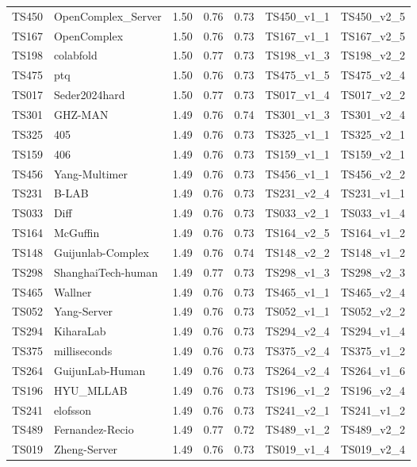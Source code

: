 \begin{longtable}{lllllll}
TS450 & OpenComplex\_Server & 1.50 & 0.76 & 0.73 & TS450\_v1\_1 & TS450\_v2\_5 \\ 
TS167 & OpenComplex & 1.50 & 0.76 & 0.73 & TS167\_v1\_1 & TS167\_v2\_5 \\ 
TS198 & colabfold & 1.50 & 0.77 & 0.73 & TS198\_v1\_3 & TS198\_v2\_2 \\ 
TS475 & ptq & 1.50 & 0.76 & 0.73 & TS475\_v1\_5 & TS475\_v2\_4 \\ 
TS017 & Seder2024hard & 1.50 & 0.77 & 0.73 & TS017\_v1\_4 & TS017\_v2\_2 \\ 
TS301 & GHZ-MAN & 1.49 & 0.76 & 0.74 & TS301\_v1\_3 & TS301\_v2\_4 \\ 
TS325 & 405 & 1.49 & 0.76 & 0.73 & TS325\_v1\_1 & TS325\_v2\_1 \\ 
TS159 & 406 & 1.49 & 0.76 & 0.73 & TS159\_v1\_1 & TS159\_v2\_1 \\ 
TS456 & Yang-Multimer & 1.49 & 0.76 & 0.73 & TS456\_v1\_1 & TS456\_v2\_2 \\ 
TS231 & B-LAB & 1.49 & 0.76 & 0.73 & TS231\_v2\_4 & TS231\_v1\_1 \\ 
TS033 & Diff & 1.49 & 0.76 & 0.73 & TS033\_v2\_1 & TS033\_v1\_4 \\ 
TS164 & McGuffin & 1.49 & 0.76 & 0.73 & TS164\_v2\_5 & TS164\_v1\_2 \\ 
TS148 & Guijunlab-Complex & 1.49 & 0.76 & 0.74 & TS148\_v2\_2 & TS148\_v1\_2 \\ 
TS298 & ShanghaiTech-human & 1.49 & 0.77 & 0.73 & TS298\_v1\_3 & TS298\_v2\_3 \\ 
TS465 & Wallner & 1.49 & 0.76 & 0.73 & TS465\_v1\_1 & TS465\_v2\_4 \\ 
TS052 & Yang-Server & 1.49 & 0.76 & 0.73 & TS052\_v1\_1 & TS052\_v2\_2 \\ 
TS294 & KiharaLab & 1.49 & 0.76 & 0.73 & TS294\_v2\_4 & TS294\_v1\_4 \\ 
TS375 & milliseconds & 1.49 & 0.76 & 0.73 & TS375\_v2\_4 & TS375\_v1\_2 \\ 
TS264 & GuijunLab-Human & 1.49 & 0.76 & 0.73 & TS264\_v2\_4 & TS264\_v1\_6 \\ 
TS196 & HYU\_MLLAB & 1.49 & 0.76 & 0.73 & TS196\_v1\_2 & TS196\_v2\_4 \\ 
TS241 & elofsson & 1.49 & 0.76 & 0.73 & TS241\_v2\_1 & TS241\_v1\_2 \\ 
TS489 & Fernandez-Recio & 1.49 & 0.77 & 0.72 & TS489\_v1\_2 & TS489\_v2\_2 \\ 
TS019 & Zheng-Server & 1.49 & 0.76 & 0.73 & TS019\_v1\_4 & TS019\_v2\_4 \\ 

\end{longtable}
